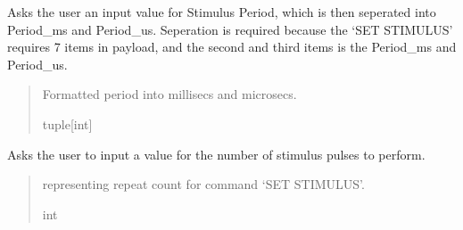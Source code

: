 \documentclass[letterpaper,10pt,english]{sphinxmanual}
\begin{document}
\begin{fulllineitems}
\begin{fulllineitems}
\label{\detokenize{Setup.SetupOneDevice:Setup.SetupOneDevice.Setup_8480SC.Setup8480SC._ChoosePeriod}}
\pysigstartsignatures
{}
\pysigstopsignatures
\sphinxAtStartPar
Asks the user an input value for Stimulus Period, which is then seperated into Period\_ms and Period\_us.            Seperation is required because the ‘SET STIMULUS’ requires 7 items in payload, and the second and third items            is the Period\_ms and Period\_us.
\begin{quote}\begin{description}
\sphinxAtStartPar
Formatted period into millisecs and microsecs.

\sphinxAtStartPar
tuple{[}int{]}

\end{description}\end{quote}

\end{fulllineitems}


\begin{fulllineitems}
\label{\detokenize{Setup.SetupOneDevice:Setup.SetupOneDevice.Setup_8480SC.Setup8480SC._ChooseRepeat}}
\pysigstartsignatures
{}
\pysigstopsignatures
\sphinxAtStartPar
Asks the user to input a value for the number of stimulus pulses to perform.
\begin{quote}\begin{description}
\sphinxAtStartPar
representing repeat count for command ‘SET STIMULUS’.

\sphinxAtStartPar
int

\end{description}\end{quote}

\end{fulllineitems}



\end{fulllineitems}
\end{document}
